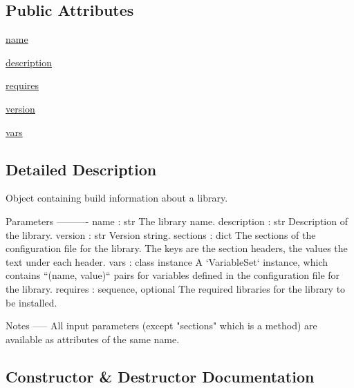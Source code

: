 \subsection*{Public Attributes}
\begin{DoxyCompactItemize}
\item 
\hyperlink{classnumpy_1_1distutils_1_1npy__pkg__config_1_1LibraryInfo_a36a7b6f0ecf3cc02c8c28b71faaa97e1}{name}
\item 
\hyperlink{classnumpy_1_1distutils_1_1npy__pkg__config_1_1LibraryInfo_af604254c7be202e2677f6b1d155f80c4}{description}
\item 
\hyperlink{classnumpy_1_1distutils_1_1npy__pkg__config_1_1LibraryInfo_a786eccf7abb966fca0475a2c4d7882dc}{requires}
\item 
\hyperlink{classnumpy_1_1distutils_1_1npy__pkg__config_1_1LibraryInfo_a527640fd9e0c71c0d42c8b3d1f5d2f5d}{version}
\item 
\hyperlink{classnumpy_1_1distutils_1_1npy__pkg__config_1_1LibraryInfo_abbbe44c4870bfa86f0dbd7b7b27afc94}{vars}
\end{DoxyCompactItemize}


\subsection{Detailed Description}
\begin{DoxyVerb}Object containing build information about a library.

Parameters
----------
name : str
    The library name.
description : str
    Description of the library.
version : str
    Version string.
sections : dict
    The sections of the configuration file for the library. The keys are
    the section headers, the values the text under each header.
vars : class instance
    A `VariableSet` instance, which contains ``(name, value)`` pairs for
    variables defined in the configuration file for the library.
requires : sequence, optional
    The required libraries for the library to be installed.

Notes
-----
All input parameters (except "sections" which is a method) are available as
attributes of the same name.\end{DoxyVerb}
 

\subsection{Constructor \& Destructor Documentation}
\mbox{\label{classnumpy_1_1distutils_1_1npy__pkg__config_1_1LibraryInfo_ac5c2692bfa8b68a3b2c5fa167d4e46c8}} 
